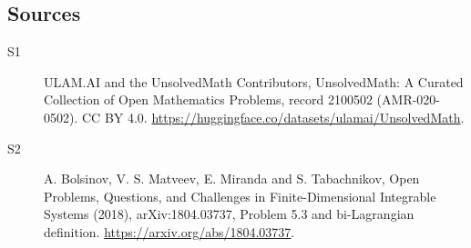 \documentclass[11pt]{article}
\begin{document}
\subsection{Sources}
\begin{description}
\item[\hypertarget{source:2100502:1}{S1}] ULAM.AI and the UnsolvedMath Contributors, UnsolvedMath: A Curated Collection of Open Mathematics Problems, record 2100502 (AMR-020-0502). CC BY 4.0. \url{https://huggingface.co/datasets/ulamai/UnsolvedMath}.
\item[\hypertarget{source:2100502:2}{S2}] A. Bolsinov, V. S. Matveev, E. Miranda and S. Tabachnikov, Open Problems, Questions, and Challenges in Finite-Dimensional Integrable Systems (2018), arXiv:1804.03737, Problem 5.3 and bi-Lagrangian definition. \url{https://arxiv.org/abs/1804.03737}.
\end{description}
\label{end:2100502}
\end{document}
